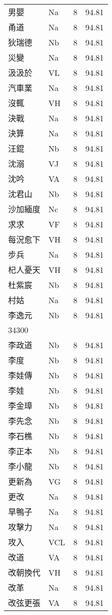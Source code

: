 \documentclass[twocolumn]{book}
\begin{document}
\begin{supertabular}{llrr}
男嬰 & Na & 8 &  94.81\\
甬道 & Na & 8 &  94.81\\
狄瑞德 & Nb & 8 &  94.81\\
災變 & Na & 8 &  94.81\\
汲汲於 & VL & 8 &  94.81\\
汽車業 & Na & 8 &  94.81\\
沒輒 & VH & 8 &  94.81\\
決戰 & Na & 8 &  94.81\\
決算 & Na & 8 &  94.81\\
汪錕 & Nb & 8 &  94.81\\
沈溺 & VJ & 8 &  94.81\\
沈吟 & VA & 8 &  94.81\\
沈君山 & Nb & 8 &  94.81\\
沙加緬度 & Nc & 8 &  94.81\\
求求 & VF & 8 &  94.81\\
每況愈下 & VH & 8 &  94.81\\
步兵 & Na & 8 &  94.81\\
杞人憂天 & VH & 8 &  94.81\\
杜紫宸 & Nb & 8 &  94.81\\
村姑 & Na & 8 &  94.81\\
李逸元 & Nb & 8 &  94.81\\
34300\\
李政道 & Nb & 8 &  94.81\\
李度 & Nb & 8 &  94.81\\
李娃傳 & Nb & 8 &  94.81\\
李娃 & Nb & 8 &  94.81\\
李金璋 & Nb & 8 &  94.81\\
李先念 & Nb & 8 &  94.81\\
李石樵 & Nb & 8 &  94.81\\
李正本 & Nb & 8 &  94.81\\
李小龍 & Nb & 8 &  94.81\\
更新為 & VG & 8 &  94.81\\
更改 & Na & 8 &  94.81\\
旱鴨子 & Na & 8 &  94.81\\
攻擊力 & Na & 8 &  94.81\\
攻入 & VCL & 8 &  94.81\\
改道 & VA & 8 &  94.81\\
改朝換代 & VH & 8 &  94.81\\
改革 & Na & 8 &  94.81\\
改弦更張 & VA & 8 &  94.81\\

\end{supertabular}
\end{document}
